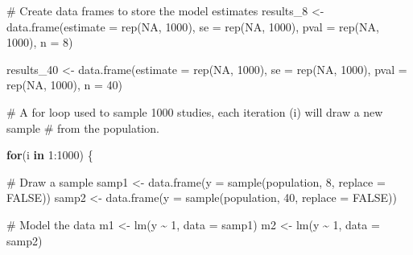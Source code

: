 \documentclass[
  letterpaper,
  DIV=11,
  numbers=noendperiod]{scrreprt}
\newenvironment{Shaded}{\begin{snugshade}}{\end{snugshade}}
\newcommand{\AttributeTok}[1]{\textcolor[rgb]{0.40,0.45,0.13}{#1}}
\newcommand{\CommentTok}[1]{\textcolor[rgb]{0.37,0.37,0.37}{#1}}
\newcommand{\ConstantTok}[1]{\textcolor[rgb]{0.56,0.35,0.01}{#1}}
\newcommand{\ControlFlowTok}[1]{\textcolor[rgb]{0.00,0.23,0.31}{\textbf{#1}}}
\newcommand{\DecValTok}[1]{\textcolor[rgb]{0.68,0.00,0.00}{#1}}
\newcommand{\FunctionTok}[1]{\textcolor[rgb]{0.28,0.35,0.67}{#1}}
\newcommand{\NormalTok}[1]{\textcolor[rgb]{0.00,0.23,0.31}{#1}}
\newcommand{\OtherTok}[1]{\textcolor[rgb]{0.00,0.23,0.31}{#1}}
\newcommand{\SpecialCharTok}[1]{\textcolor[rgb]{0.37,0.37,0.37}{#1}}
\begin{document}
\begin{Shaded}
\begin{Highlighting}[]
\CommentTok{\# Create data frames to store the model estimates}
\NormalTok{results\_8 }\OtherTok{\textless{}{-}} \FunctionTok{data.frame}\NormalTok{(}\AttributeTok{estimate =} \FunctionTok{rep}\NormalTok{(}\ConstantTok{NA}\NormalTok{, }\DecValTok{1000}\NormalTok{), }
                      \AttributeTok{se =} \FunctionTok{rep}\NormalTok{(}\ConstantTok{NA}\NormalTok{, }\DecValTok{1000}\NormalTok{), }
                      \AttributeTok{pval =} \FunctionTok{rep}\NormalTok{(}\ConstantTok{NA}\NormalTok{, }\DecValTok{1000}\NormalTok{), }
                      \AttributeTok{n =} \DecValTok{8}\NormalTok{)  }

\NormalTok{results\_40 }\OtherTok{\textless{}{-}} \FunctionTok{data.frame}\NormalTok{(}\AttributeTok{estimate =} \FunctionTok{rep}\NormalTok{(}\ConstantTok{NA}\NormalTok{, }\DecValTok{1000}\NormalTok{), }
                      \AttributeTok{se =} \FunctionTok{rep}\NormalTok{(}\ConstantTok{NA}\NormalTok{, }\DecValTok{1000}\NormalTok{), }
                      \AttributeTok{pval =} \FunctionTok{rep}\NormalTok{(}\ConstantTok{NA}\NormalTok{, }\DecValTok{1000}\NormalTok{), }
                      \AttributeTok{n =} \DecValTok{40}\NormalTok{)}

\CommentTok{\# A for loop used to sample 1000 studies, each iteration (i) will draw a new sample}
\CommentTok{\# from the population. }

\ControlFlowTok{for}\NormalTok{(i }\ControlFlowTok{in} \DecValTok{1}\SpecialCharTok{:}\DecValTok{1000}\NormalTok{) \{}
  
  \CommentTok{\# Draw a sample }
\NormalTok{  samp1 }\OtherTok{\textless{}{-}} \FunctionTok{data.frame}\NormalTok{(}\AttributeTok{y =} \FunctionTok{sample}\NormalTok{(population, }\DecValTok{8}\NormalTok{, }\AttributeTok{replace =} \ConstantTok{FALSE}\NormalTok{))}
\NormalTok{  samp2 }\OtherTok{\textless{}{-}} \FunctionTok{data.frame}\NormalTok{(}\AttributeTok{y =} \FunctionTok{sample}\NormalTok{(population, }\DecValTok{40}\NormalTok{, }\AttributeTok{replace =} \ConstantTok{FALSE}\NormalTok{))}

  \CommentTok{\# Model the data}
\NormalTok{  m1 }\OtherTok{\textless{}{-}} \FunctionTok{lm}\NormalTok{(y }\SpecialCharTok{\textasciitilde{}} \DecValTok{1}\NormalTok{, }\AttributeTok{data =}\NormalTok{ samp1)}
\NormalTok{  m2 }\OtherTok{\textless{}{-}} \FunctionTok{lm}\NormalTok{(y }\SpecialCharTok{\textasciitilde{}} \DecValTok{1}\NormalTok{, }\AttributeTok{data =}\NormalTok{ samp2)}
  

\end{Highlighting}
\end{Shaded}
\end{document}
